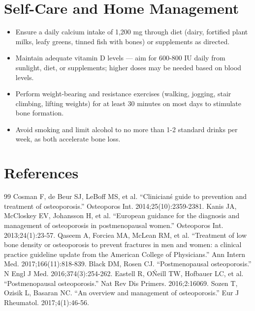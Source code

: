 \section*{Self-Care and Home Management}
\begin{itemize}
  \item Ensure a daily calcium intake of 1,200 mg through diet (dairy, fortified plant milks, leafy greens, tinned fish with bones) or supplements as directed.
  \item Maintain adequate vitamin D levels — aim for 600-800 IU daily from sunlight, diet, or supplements; higher doses may be needed based on blood levels.
  \item Perform weight-bearing and resistance exercises (walking, jogging, stair climbing, lifting weights) for at least 30 minutes on most days to stimulate bone formation.
  \item Avoid smoking and limit alcohol to no more than 1-2 standard drinks per week, as both accelerate bone loss.
\end{itemize}

\section*{References}
\begin{thebibliography}{99}
 Cosman F, de Beur SJ, LeBoff MS, et al. ``Clinician\'s guide to prevention and treatment of osteoporosis.'' Osteoporos Int. 2014;25(10):2359-2381.
 Kanis JA, McCloskey EV, Johansson H, et al. ``European guidance for the diagnosis and management of osteoporosis in postmenopausal women.'' Osteoporos Int. 2013;24(1):23-57.
 Qaseem A, Forciea MA, McLean RM, et al. ``Treatment of low bone density or osteoporosis to prevent fractures in men and women: a clinical practice guideline update from the American College of Physicians.'' Ann Intern Med. 2017;166(11):818-839.
 Black DM, Rosen CJ. ``Postmenopausal osteoporosis.'' N Engl J Med. 2016;374(3):254-262.
 Eastell R, O\'Neill TW, Hofbauer LC, et al. ``Postmenopausal osteoporosis.'' Nat Rev Dis Primers. 2016;2:16069.
 Sozen T, Ozisik L, Basaran NC. ``An overview and management of osteoporosis.'' Eur J Rheumatol. 2017;4(1):46-56.
\end{thebibliography}
